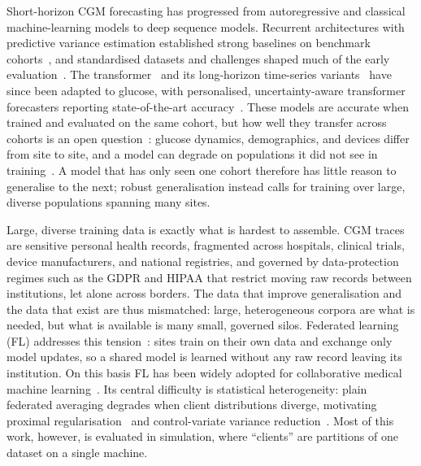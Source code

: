 \documentclass[10pt,letterpaper]{article}
\begin{document}
Short-horizon CGM forecasting has progressed from autoregressive and classical
machine-learning models to deep sequence models. Recurrent architectures with
predictive variance estimation established strong baselines on benchmark
cohorts~\cite{martinsson2020}, and standardised datasets and challenges shaped
much of the early evaluation~\cite{marling2020ohio}. The
transformer~\cite{vaswani2017attention} and its long-horizon time-series
variants~\cite{zhou2021informer,wu2021autoformer} have since been adapted to
glucose, with personalised, uncertainty-aware transformer forecasters reporting
state-of-the-art accuracy~\cite{sergazinov2023gluformer,sergazinov2024glucobench}.
These models are accurate when trained and evaluated on the same cohort, but how
well they transfer across cohorts is an open question~\cite{ghimire2024generalize}:
glucose dynamics, demographics, and devices differ from site to site, and a model
can degrade on populations it did not see in training~\cite{farahmand2025glumind}.
A model that has only seen one cohort therefore has little reason to generalise to
the next; robust generalisation instead calls for training over large, diverse
populations spanning many sites.

Large, diverse training data is exactly what is hardest to assemble. CGM traces
are sensitive personal health records, fragmented across hospitals, clinical
trials, device manufacturers, and national registries, and governed by
data-protection regimes such as the GDPR and HIPAA that restrict moving raw
records between institutions, let alone across borders. The data that improve
generalisation and the data that exist are thus mismatched: large, heterogeneous
corpora are what is needed, but what is available is many small, governed silos.
Federated learning (FL) addresses this tension~\cite{mcmahan2017fedavg}: sites
train on their own data and exchange only model updates, so a shared model is
learned without any raw record leaving its institution. On this basis FL has been
widely adopted for collaborative medical machine
learning~\cite{rieke2020future,sheller2020federated,kaissis2020secure}. Its
central difficulty is statistical heterogeneity: plain federated averaging
degrades when client distributions diverge, motivating proximal
regularisation~\cite{li2020fedprox} and control-variate variance
reduction~\cite{karimireddy2020scaffold}. Most of this work, however, is evaluated
in simulation, where ``clients'' are partitions of one dataset on a single
machine.
\end{document}
